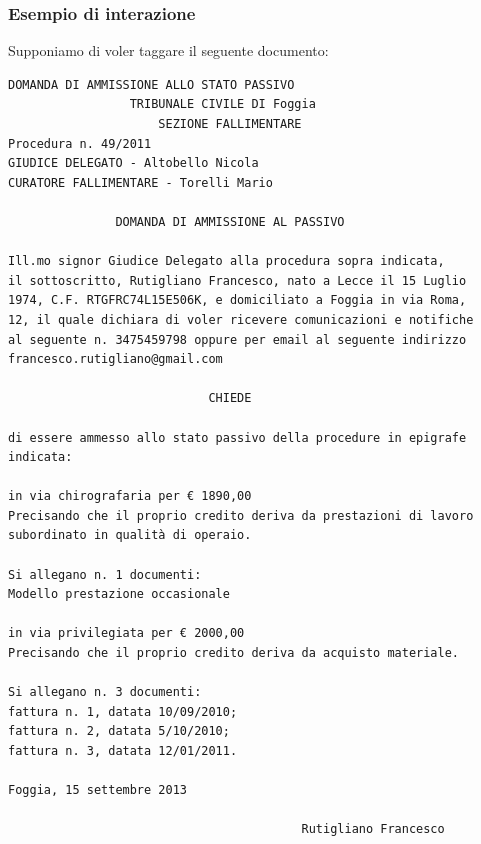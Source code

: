 \subsubsection{Esempio di interazione}
	Supponiamo di voler taggare il seguente documento:
	
	\small
	\label{doc-example}
	\begin{Verbatim}[frame=single,framesep=3mm]
	  DOMANDA DI AMMISSIONE ALLO STATO PASSIVO
                 TRIBUNALE CIVILE DI Foggia
                     SEZIONE FALLIMENTARE
Procedura n. 49/2011
GIUDICE DELEGATO - Altobello Nicola
CURATORE FALLIMENTARE - Torelli Mario
                   
               DOMANDA DI AMMISSIONE AL PASSIVO

Ill.mo signor Giudice Delegato alla procedura sopra indicata, 
il sottoscritto, Rutigliano Francesco, nato a Lecce il 15 Luglio
1974, C.F. RTGFRC74L15E506K, e domiciliato a Foggia in via Roma,
12, il quale dichiara di voler ricevere comunicazioni e notifiche
al seguente n. 3475459798 oppure per email al seguente indirizzo
francesco.rutigliano@gmail.com

                            CHIEDE

di essere ammesso allo stato passivo della procedure in epigrafe
indicata:

in via chirografaria per € 1890,00
Precisando che il proprio credito deriva da prestazioni di lavoro 
subordinato in qualità di operaio.

Si allegano n. 1 documenti:
Modello prestazione occasionale

in via privilegiata per € 2000,00
Precisando che il proprio credito deriva da acquisto materiale.

Si allegano n. 3 documenti:
fattura n. 1, datata 10/09/2010;
fattura n. 2, datata 5/10/2010;
fattura n. 3, datata 12/01/2011.

Foggia, 15 settembre 2013

                                         Rutigliano Francesco
	\end{Verbatim}

